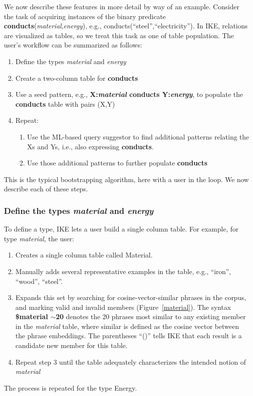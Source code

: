 \documentclass[11pt,letterpaper]{article}
\newcommand{\pred}{\bf}
\begin{document}
We now describe these features in more detail by way of an example. Consider the task of acquiring instances of the binary predicate {\pred conducts}({\it material},{\it energy}), e.g., conducts(``steel'',``electricity''). In IKE, relations are visualized as tables, so we treat this task as one of table population. The user's workflow can be summarized as follows:
\begin{enumerate}[noitemsep]
\item Define the types {\it material} and {\it energy}
\item Create a two-column table for {\pred conducts}
\item Use a seed pattern, e.g., {\bf X:{\it material} conducts Y:{\it energy}}, to populate the {\pred conducts} table with pairs (X,Y)
\item Repeat:
\begin{enumerate}[noitemsep]
  \item Use the ML-based query suggestor to find additional patterns relating the Xs and Ys, i.e., also expressing {\pred conducts}.
  \item Use those additional patterns to further populate {\pred conducts}
  \end{enumerate}
\end{enumerate}
This is the typical bootstrapping algorithm, here with a user in the loop. We now describe each of these steps.

\subsubsection{Define the types {\it material} and {\it energy}}

To define a type, IKE lets a user build a single column table. For example, for type {\it material}, the user:
\begin{enumerate}[noitemsep]
\item Creates a single column table called Material.
\item Manually adds several representative examples in the table, e.g., ``iron'', ``wood'', ``steel''.
\item Expands this set by searching for cosine-vector-similar phrases in the corpus, and marking valid and invalid members (Figure~\ref{material}). The syntax {\bf \$material $\sim$20} denotes the 20 phrases most similar to any existing member in the {\it material} table, where similar is defined as the cosine vector between the phrase embeddings.
The parentheses ``()'' tells IKE that each result is a candidate new member for this table.
\item Repeat step 3 until the table adequately characterizes the intended notion of {\it material}
\end{enumerate}
The process is repeated for the type Energy.
\end{document}
